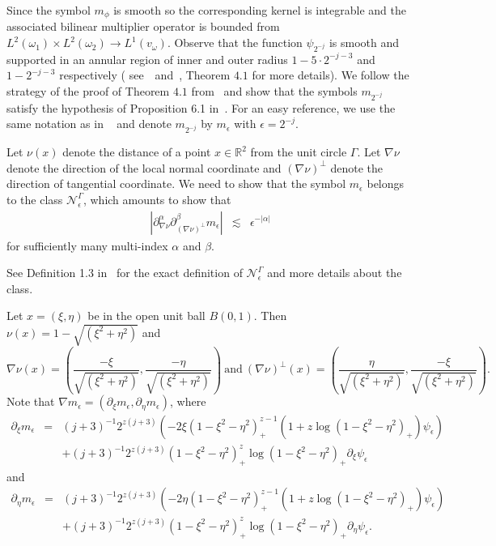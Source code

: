 \documentclass[a4paper,12pt]{amsart}
\newcommand{\R}{{\mathbb {R}}}
\begin{document}
 Since the symbol $m_{\phi}$ is smooth so the corresponding kernel is integrable and the associated bilinear multiplier operator is bounded from $L^{2}(\omega_{1})\times L^{2}(\omega_{2})\rightarrow L^{1}(v_{\omega})$. Observe that the  function  $\psi_{2^{-j}}$ is smooth and supported in an annular region of inner and outer radius $1-5\cdot2^{-j-3}$ and $1-2^{-j-3}$ respectively ( see~\cite{Grafakosmodern}~and~\cite{Bern1}, Theorem $4.1$ for more details). 
We follow the strategy of the proof of Theorem $4.1$ from~\cite{Bern1} and show that the symbols $m_{2^{-j}}$ satisfy the hypothesis of Proposition 6.1 in~\cite{FP}. For an easy reference, we use the same notation as in ~\cite{FP} and denote $m_{2^{-j}}$ by $m_{\epsilon}$ with $\epsilon=2^{-j}$. 

Let $\nu(x)$ denote the distance of a point $x\in \R^2$ from the unit circle $\Gamma$. Let $\nabla\nu$ denote the direction of the local normal coordinate and $(\nabla\nu)^{\perp}$ denote the direction of tangential coordinate. We need to show that the symbol $m_{\epsilon}$  belongs to the class $\mathcal{N}^{\Gamma}_{\epsilon}$, which amounts to show that 
\begin{eqnarray}\label{prop61}
\left| \partial^{\alpha}_{\nabla \nu} \partial^{\beta}_{(\nabla \nu)^{\perp}} m_{\epsilon}\right|
&\lesssim & \epsilon^{-\vert \alpha\vert}
\end{eqnarray}
for sufficiently many multi-index $\alpha$ and $\beta$. 

See Definition 1.3 in~\cite{FP} for the exact definition of  
$\mathcal{N}^{\Gamma}_{\epsilon}$ and more details about the class. 

Let $x=(\xi,\eta)$ be in the open unit ball $B(0,1)$. Then $\nu(x)=1-\sqrt{(\xi^{2}+\eta^{2})}$ and 
$$\nabla\nu(x)=\left(\frac{-\xi}{\sqrt{(\xi^{2}+\eta^{2})}},\frac{-\eta}{\sqrt{(\xi^{2}+\eta^{2})}}\right)~\text{and}~(\nabla\nu)^{\perp}(x)=\left(\frac{\eta}{\sqrt{(\xi^{2}+\eta^{2})}},\frac{-\xi}{\sqrt{(\xi^{2}+\eta^{2})}}\right).$$
Note that  $\nabla m_{\epsilon}=(\partial_{\xi} m_{\epsilon}, \partial_{\eta} m_{\epsilon})$, 
where 
\begin{eqnarray*} \partial_{\xi} m_{\epsilon}
	&=&(j+3)^{-1}2^{z(j+3)}\left(-2\xi(1-\xi^{2}-\eta^{2})^{z-1}_{+}\left(1+z\log(1-\xi^{2}-\eta^{2})_{+}\right)\psi_{\epsilon}\right)\\
	& &+(j+3)^{-1}2^{z(j+3)}(1-\xi^{2}-\eta^{2})^{z}_{+}\log(1-\xi^{2}-\eta^{2})_{+}\partial_{\xi} \psi_{\epsilon}
\end{eqnarray*} 
and 
\begin{eqnarray*} \partial_{\eta} m_{\epsilon}
	&=&(j+3)^{-1}2^{z(j+3)}\left(-2\eta(1-\xi^{2}-\eta^{2})^{z-1}_{+}\left(1+z\log(1-\xi^{2}-\eta^{2})_{+}\right)\psi_{\epsilon}\right)\\
	&&+(j+3)^{-1}2^{z(j+3)}(1-\xi^{2}-\eta^{2})^{z}_{+}\log(1-\xi^{2}-\eta^{2})_{+}\partial_{\eta} \psi_{\epsilon}.
\end{eqnarray*} 
\end{document}
